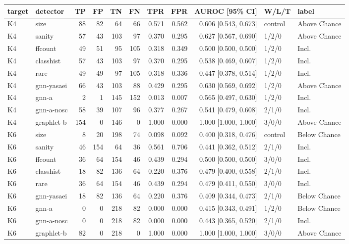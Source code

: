 \begin{tabular}{@{}llrrrrrrrll@{}}
\toprule
target & detector & TP & FP & TN & FN & TPR & FPR & AUROC [95\% CI] & W/L/T & label \\
\midrule
K4 & size & 88 & 82 & 64 & 66 & 0.571 & 0.562 & 0.606 [0.543, 0.673] & control & Above Chance \\
K4 & sanity & 57 & 43 & 103 & 97 & 0.370 & 0.295 & 0.627 [0.567, 0.690] & 1/2/0 & Above Chance \\
K4 & ffcount & 49 & 51 & 95 & 105 & 0.318 & 0.349 & 0.500 [0.500, 0.500] & 1/2/0 & Incl. \\
K4 & classhist & 57 & 43 & 103 & 97 & 0.370 & 0.295 & 0.538 [0.469, 0.607] & 1/2/0 & Incl. \\
K4 & rare & 49 & 49 & 97 & 105 & 0.318 & 0.336 & 0.447 [0.378, 0.514] & 1/2/0 & Incl. \\
K4 & gnn-yasaei & 66 & 43 & 103 & 88 & 0.429 & 0.295 & 0.630 [0.569, 0.692] & 1/2/0 & Above Chance \\
K4 & gnn-a & 2 & 1 & 145 & 152 & 0.013 & 0.007 & 0.565 [0.497, 0.630] & 1/2/0 & Incl. \\
K4 & gnn-a-nosc & 58 & 39 & 107 & 96 & 0.377 & 0.267 & 0.541 [0.479, 0.608] & 2/1/0 & Incl. \\
K4 & graphlet-b & 154 & 0 & 146 & 0 & 1.000 & 0.000 & 1.000 [1.000, 1.000] & 3/0/0 & Above Chance \\
\midrule
K6 & size & 8 & 20 & 198 & 74 & 0.098 & 0.092 & 0.400 [0.318, 0.476] & control & Below Chance \\
K6 & sanity & 46 & 154 & 64 & 36 & 0.561 & 0.706 & 0.441 [0.362, 0.512] & 2/1/0 & Incl. \\
K6 & ffcount & 36 & 64 & 154 & 46 & 0.439 & 0.294 & 0.500 [0.500, 0.500] & 3/0/0 & Incl. \\
K6 & classhist & 18 & 82 & 136 & 64 & 0.220 & 0.376 & 0.479 [0.400, 0.558] & 2/1/0 & Incl. \\
K6 & rare & 36 & 64 & 154 & 46 & 0.439 & 0.294 & 0.479 [0.411, 0.550] & 3/0/0 & Incl. \\
K6 & gnn-yasaei & 18 & 82 & 136 & 64 & 0.220 & 0.376 & 0.409 [0.344, 0.473] & 2/1/0 & Below Chance \\
K6 & gnn-a & 0 & 0 & 218 & 82 & 0.000 & 0.000 & 0.415 [0.343, 0.491] & 1/2/0 & Below Chance \\
K6 & gnn-a-nosc & 0 & 0 & 218 & 82 & 0.000 & 0.000 & 0.443 [0.365, 0.520] & 2/1/0 & Incl. \\
K6 & graphlet-b & 82 & 0 & 218 & 0 & 1.000 & 0.000 & 1.000 [1.000, 1.000] & 3/0/0 & Above Chance \\

\end{tabular}
